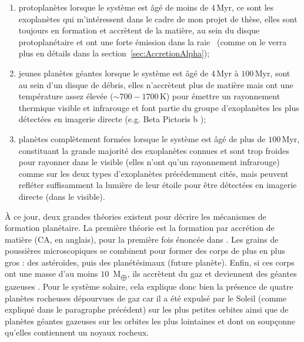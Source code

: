 \begin{enumerate}
    \item protoplanètes lorsque le système est âgé de moins de $4 \,$Myr, ce sont les exoplanètes qui m'intéressent dans le cadre de mon projet de thèse, elles sont toujours en formation et accrètent de la matière, au sein du disque protoplanétaire et ont une forte émission dans la raie \ha~(comme on le verra plus en détails dans la section~\ref{sec:AccretionAlpha});
    
    \item jeunes planètes géantes lorsque le système est âgé de $4 \,$Myr à $100 \,$Myr, sont au sein d'un disque de débris, elles n'accrètent plus de matière mais ont une température assez élevée ($\sim 700 - 1700 \,$K) pour émettre un rayonnement thermique visible et infrarouge et font partie du groupe d'exoplanètes les plus détectées en imagerie directe (e.g. Beta Pictoris b \citep{lagrange2010});
    
    \item planètes complètement formées lorsque le système est âgé de plus de $100 \,$Myr, constituant la grande majorité des exoplanètes connues et sont trop froides pour rayonner dans le visible (elles n'ont qu'un rayonnement infrarouge) comme sur les deux types d'exoplanètes précédemment cités, mais peuvent refléter suffisamment la lumière de leur étoile pour être détectées en imagerie directe (dans le visible).
\end{enumerate}

À ce jour, deux grandes théories existent pour décrire les mécanismes de formation planétaire. La première théorie est la formation par accrétion de matière (\ac{CA}, en anglais), pour la première fois énoncée dans \cite{safronov1972}. Les grains de poussières microscopiques se combinent pour former des corps de plus en plus gros : des astéroïdes, puis des planétésimaux (future planète). Enfin, si ces corps ont une masse d'au moins $10 \,$ M$_{\bigoplus}$, ils accrètent du gaz et deviennent des géantes gazeuses \citep{pollack1996}. Pour le système solaire, cela explique donc bien la présence de quatre planètes rocheuses dépourvues de gaz car il a été expulsé par le Soleil (comme expliqué dans le paragraphe précédent) sur les plus petites orbites ainsi que de planètes géantes gazeuses sur les orbites les plus lointaines et dont on soupçonne qu'elles contiennent un noyaux rocheux.

